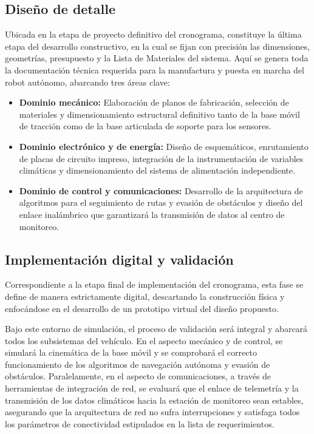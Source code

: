 \subsection{Diseño de detalle} 
Ubicada en la etapa de proyecto definitivo del cronograma, constituye la última etapa del desarrollo constructivo, en la cual se fijan con precisión las dimensiones, geometrías, presupuesto y la Lista de Materiales del sistema. Aquí se genera toda la documentación técnica requerida para la manufactura y puesta en marcha del robot autónomo, abarcando tres áreas clave: 

\begin{itemize} 
    \item \textbf{Dominio mecánico:} Elaboración de planos de fabricación, selección de materiales y dimensionamiento estructural definitivo tanto de la base móvil de tracción como de la base articulada de soporte para los sensores. 
    \item \textbf{Dominio electrónico y de energía:} Diseño de esquemáticos, enrutamiento de placas de circuito impreso, integración de la instrumentación de variables climáticas y dimensionamiento del sistema de alimentación independiente. 
    \item \textbf{Dominio de control y comunicaciones:} Desarrollo de la arquitectura de algoritmos para el seguimiento de rutas y evasión de obstáculos y diseño del enlace inalámbrico que garantizará la transmisión de datos al centro de monitoreo. 
\end{itemize}

\subsection{Implementación digital y validación}
Correspondiente a la etapa final de implementación del cronograma, esta fase se define de manera estrictamente digital, descartando la construcción física y enfocándose en el desarrollo de un prototipo virtual del diseño propuesto. 

Bajo este entorno de simulación, el proceso de validación será integral y abarcará todos los subsistemas del vehículo. En el aspecto mecánico y de control, se simulará la cinemática de la base móvil y se comprobará el correcto funcionamiento de los algoritmos de navegación autónoma y evasión de obstáculos. Paralelamente, en el aspecto de comunicaciones, a través de herramientas de integración de red, se evaluará que el enlace de telemetría y la transmisión de los datos climáticos hacia la estación de monitoreo sean estables, asegurando que la arquitectura de red no sufra interrupciones y satisfaga todos los parámetros de conectividad estipulados en la lista de requerimientos.
